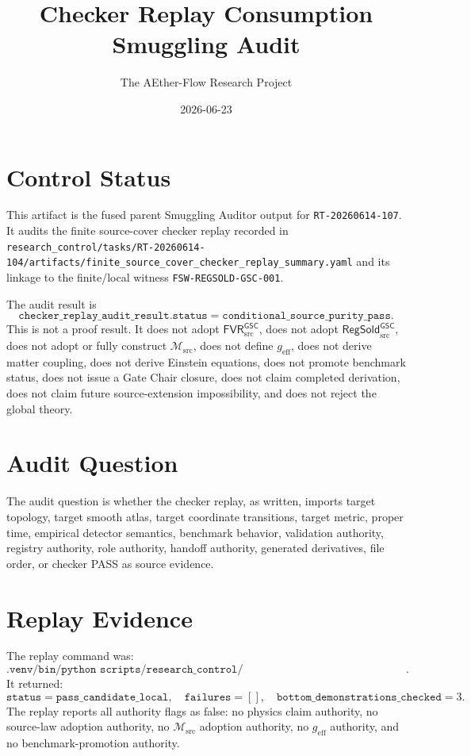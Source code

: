 \documentclass[11pt]{article}
\title{Checker Replay Consumption Smuggling Audit}
\author{The AEther-Flow Research Project}
\date{2026-06-23}
\newcommand{\Msrc}{\mathcal{M}_{\mathrm{src}}}
\newcommand{\geff}{g_{\mathrm{eff}}}
\newcommand{\RegSold}{\mathsf{RegSold}_{\mathrm{src}}^{\mathsf{GSC}}}
\newcommand{\FVRSrc}{\mathsf{FVR}_{\mathrm{src}}^{\mathsf{GSC}}}
\begin{document}
\maketitle

\section*{Control Status}

This artifact is the fused parent Smuggling Auditor output for
\texttt{RT-20260614-107}. It audits the finite source-cover checker replay
recorded in
\texttt{research\_control/tasks/RT-20260614-104/artifacts/finite\_source\_cover\_checker\_replay\_summary.yaml}
and its linkage to the finite/local witness
\texttt{FSW-REGSOLD-GSC-001}.

The audit result is
\[
  \texttt{checker\_replay\_audit\_result.status}
  =
  \texttt{conditional\_source\_purity\_pass}.
\]
This is not a proof result. It does not adopt \(\FVRSrc\), does not adopt
\(\RegSold\), does not adopt or fully construct \(\Msrc\), does not define
\(\geff\), does not derive matter coupling, does not derive Einstein equations,
does not promote benchmark status, does not issue a Gate Chair closure, does
not claim completed derivation, does not claim future source-extension
impossibility, and does not reject the global theory.

\section{Audit Question}

The audit question is whether the checker replay, as written, imports target
topology, target smooth atlas, target coordinate transitions, target metric,
proper time, empirical detector semantics, benchmark behavior, validation
authority, registry authority, role authority, handoff authority, generated
derivatives, file order, or checker PASS as source evidence.

\section{Replay Evidence}

The replay command was:
\[
\texttt{.venv/bin/python scripts/research\_control/finite\_source\_cover\_model\_checker.py --input research\_control/tasks/RT-20260614-095/artifacts/finite\_source\_witness.yaml --json}.
\]
It returned:
\[
  \texttt{status}=\texttt{pass\_candidate\_local},
  \quad
  \texttt{failures}=[],
  \quad
  \texttt{bottom\_demonstrations\_checked}=3.
\]
The replay reports all authority flags as false: no physics claim authority,
no source-law adoption authority, no \(\Msrc\) adoption authority, no
\(\geff\) authority, and no benchmark-promotion authority.
\end{document}

